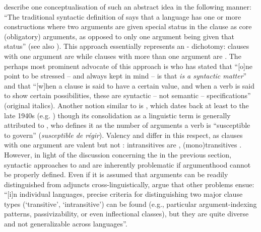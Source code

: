 \citet[471]{lapolla:al:2011} describe one conceptualisation of such an abstract idea in the following manner: “The traditional syntactic definition of  says that a language has one or more constructions where two arguments are given special status in the clause as core (obligatory) arguments, as opposed to only one argument being given that status” (see also \citealt[143]{croft:2003}). This approach essentially represents an - dichotomy: clauses with one argument are  while clauses with more than one argument are . The perhaps most prominent advocate of this approach is \citet[116]{dixon:2010b} who has stated that “[o]ne point to be stressed -- and always kept in mind -- is that \textit{ is a syntactic matter}” and that “[w]hen a clause is said to have a certain  value, and when a verb is said to show certain  possibilities, these are syntactic -- not semantic -- specifications” (original italics). Another notion similar to  is , which dates back at least to the late 1940s (e.g. \citealt[114f.]{de-groot:1949}) though its consolidation as a linguistic term is generally attributed to \citet[238, 670]{tesniere:1959}, who defines it as the number of arguments a verb is “susceptible to govern” (\textit{susceptible de régir}). Valency and  differ in this respect, as clauses with one argument are valent but not : intransitives are , (mono)transitives . However, in light of the discussion concerning the  in the previous section, syntactic approaches to  and  are inherently problematic if argumenthood cannot be properly defined. Even if it is assumed that arguments can be readily distinguished from adjuncts cross-linguistically, \citet[544]{haspelmath:2011a} argue that other problems ensue: “[i]n individual languages, precise criteria for distinguishing two major clause types (‘transitive’, ‘intransitive’) can be found (e.g., particular argument-indexing patterns, passivizability, or even inflectional classes), but they are quite diverse and not generalizable across languages”.

